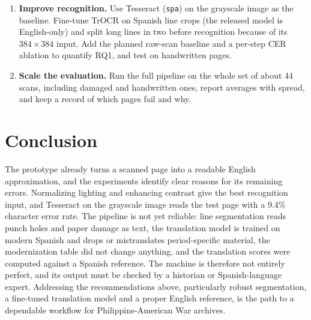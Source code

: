 \documentclass[10pt,twocolumn]{article}
\begin{document}
\begin{enumerate}
  \item \textbf{Improve recognition.} Use Tesseract (\texttt{spa}) on the grayscale image as the baseline. Fine-tune TrOCR on Spanish line crops (the released model is English-only) and split long lines in two before recognition because of its $384\times384$ input. Add the planned raw-scan baseline and a per-step CER ablation to quantify RQ1, and test on handwritten pages.
  \item \textbf{Scale the evaluation.} Run the full pipeline on the whole set of about 44 scans, including damaged and handwritten ones, report averages with spread, and keep a record of which pages fail and why.
\end{enumerate}

\section{Conclusion}
The prototype already turns a scanned page into a readable English approximation, and the experiments identify clear reasons for its remaining errors. Normalizing lighting and enhancing contrast give the best recognition input, and Tesseract on the grayscale image reads the test page with a 9.4\% character error rate. The pipeline is not yet reliable: line segmentation reads punch holes and paper damage as text, the translation model is trained on modern Spanish and drops or mistranslates period-specific material, the modernization table did not change anything, and the translation scores were computed against a Spanish reference. The machine is therefore not entirely perfect, and its output must be checked by a historian or Spanish-language expert. Addressing the recommendations above, particularly robust segmentation, a fine-tuned translation model and a proper English reference, is the path to a dependable workflow for Philippine-American War archives.
\end{document}
